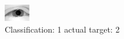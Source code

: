 \begin{figure}[h!]
\begin{center}
\includegraphics[width=0.60\columnwidth]{figures/ID2317_class_1_target_2.png}
\end{center}
\caption{ Classification: 1 actual target: 2}
\label{fig:ID2317_class_1_target_2}
\end{figure}
